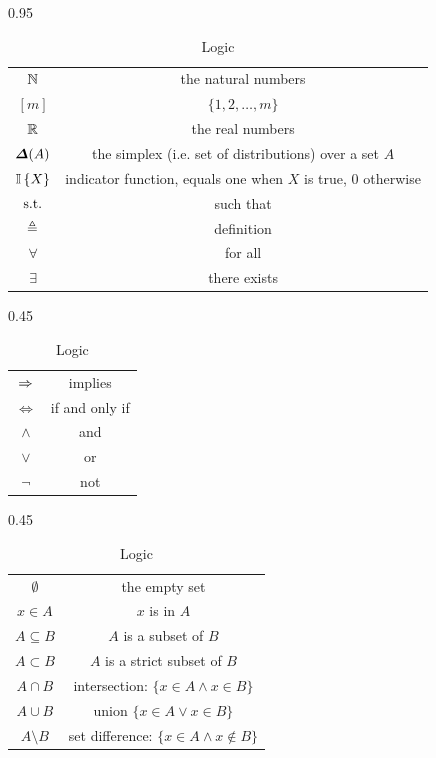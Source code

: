 \begin{table}
  \begin{subtable}[t]{0.95\textwidth}
      \begin{tabular}{cc}
        \hline  
      ${\mathbb{N}}$ & the natural numbers\\
      $[m]$ & $\{1, 2, \ldots, m\}$\\
      ${\mathbb{R}}$ & the real numbers\\
      $\Simplex(A)$ & the simplex (i.e. set of distributions) over a set $A$\\
      $\mathop{\mbox{\ensuremath{\mathbb{I}}}}\left\{X\right\}$ & indicator function, equals one when $X$ is true, 0 otherwise\\
      $\mathop{\rm s.t.}$ & such that\\
      $\mathrel{\triangleq}$ & definition\\
      $\forall$ & for all\\
      $\exists$ & there exists\\\hline
    \end{tabular}
    \caption{General symbols and functions}
  \end{subtable}
  \begin{subtable}[h]{0.45\textwidth}
    \begin{tabular}{cc}
      \hline  
      $\Rightarrow$ & implies\\
      $\Leftrightarrow$ & if and only if\\
      $\wedge$ & and\\
      $\vee$ & or\\
      $\neg$ & not\\\hline
    \end{tabular}
    \caption{Logic}
  \end{subtable}
  \begin{subtable}[h]{0.45\textwidth}
    \begin{tabular}{cc}
      \hline  
      $\emptyset$ & the empty set\\
      $x \in A$ & $x$ is in $A$\\
      $A \subseteq B$ & $A$ is a subset of $B$\\
      $A \subset B$ & $A$ is a strict subset of $B$\\
      $A \cap B$ &  intersection: $\{x \in A \wedge x \in B\}$\\
      $A \cup B$ &  union $\{x \in A \vee x \in B\}$\\
      $A \setminus B$ &  set difference: $\{x \in A \wedge x \notin B\}$\\  

\end{tabular}
\end{subtable}
\end{table}
